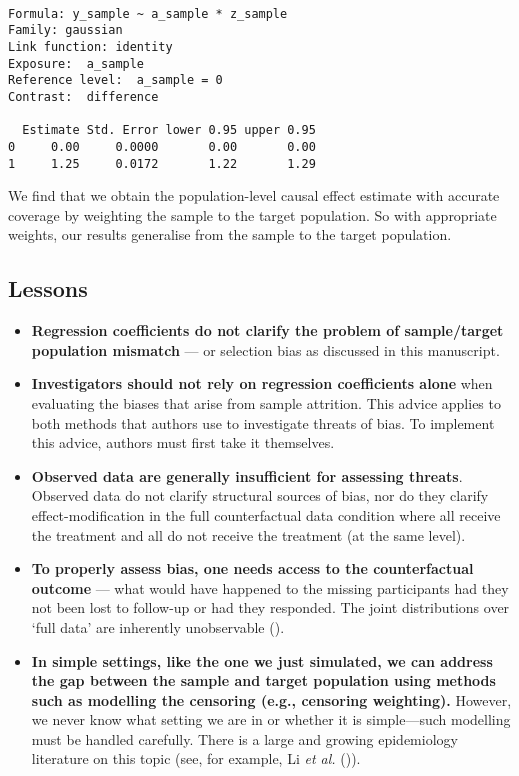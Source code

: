 \documentclass[
  single column]{article}
\providecommand{\tightlist}{%
  \setlength{\itemsep}{0pt}\setlength{\parskip}{0pt}}\usepackage{longtable,booktabs,array}
\begin{document}
\begin{verbatim}

Formula: y_sample ~ a_sample * z_sample
Family: gaussian 
Link function: identity 
Exposure:  a_sample 
Reference level:  a_sample = 0 
Contrast:  difference 

  Estimate Std. Error lower 0.95 upper 0.95
0     0.00     0.0000       0.00       0.00
1     1.25     0.0172       1.22       1.29
\end{verbatim}

We find that we obtain the population-level causal effect estimate with
accurate coverage by weighting the sample to the target population. So
with appropriate weights, our results generalise from the sample to the
target population.

\subsection{Lessons}\label{lessons}

\begin{itemize}
\tightlist
\item
  \textbf{Regression coefficients do not clarify the problem of
  sample/target population mismatch} --- or selection bias as discussed
  in this manuscript.
\item
  \textbf{Investigators should not rely on regression coefficients
  alone} when evaluating the biases that arise from sample attrition.
  This advice applies to both methods that authors use to investigate
  threats of bias. To implement this advice, authors must first take it
  themselves.
\item
  \textbf{Observed data are generally insufficient for assessing
  threats}. Observed data do not clarify structural sources of bias, nor
  do they clarify effect-modification in the full counterfactual data
  condition where all receive the treatment and all do not receive the
  treatment (at the same level).
\item
  \textbf{To properly assess bias, one needs access to the
  counterfactual outcome} --- what would have happened to the missing
  participants had they not been lost to follow-up or had they
  responded. The joint distributions over `full data' are inherently
  unobservable ().
\item
  \textbf{In simple settings, like the one we just simulated, we can
  address the gap between the sample and target population using methods
  such as modelling the censoring (e.g., censoring weighting).} However,
  we never know what setting we are in or whether it is simple---such
  modelling must be handled carefully. There is a large and growing
  epidemiology literature on this topic (see, for example, Li \emph{et
  al.} ()).
\end{itemize}
\end{document}

